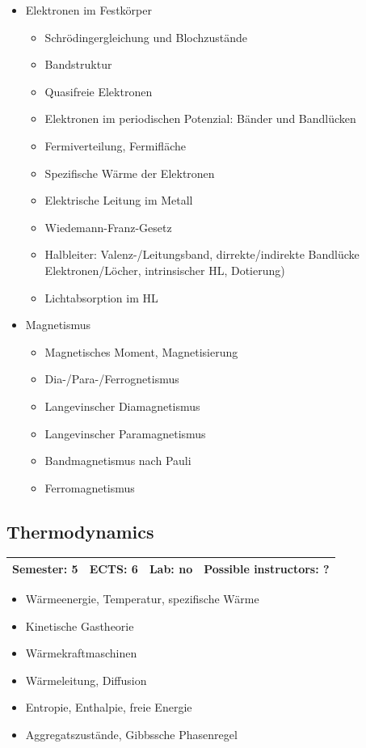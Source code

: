 \documentclass[12pt,twoside,fleqn,a4paper]{article}
\begin{document}
\begin{itemize}
\item Elektronen im Festkörper
\begin{itemize}
\item Schrödingergleichung und Blochzustände
\item Bandstruktur
\item Quasifreie Elektronen
\item Elektronen im periodischen Potenzial: Bänder und Bandlücken
\item Fermiverteilung, Fermifläche
\item Spezifische Wärme der Elektronen
\item Elektrische Leitung im Metall
\item Wiedemann-Franz-Gesetz
\item Halbleiter: Valenz-/Leitungsband, dirrekte/indirekte Bandlücke Elektronen/Löcher, intrinsischer HL, Dotierung)
\item Lichtabsorption im HL
\end{itemize}

\item Magnetismus
\begin{itemize}
\item Magnetisches Moment, Magnetisierung
\item Dia-/Para-/Ferrognetismus
\item Langevinscher Diamagnetismus
\item Langevinscher Paramagnetismus
\item Bandmagnetismus nach Pauli
\item Ferromagnetismus
\end{itemize}
\end{itemize}


\subsection{Thermodynamics}
\begin{tabular}{llll} \hline
\textbf{Semester:} 5 & \textbf{ECTS:} 6 & \textbf{Lab:} no & \textbf{Possible instructors:} ?\\
\hline
\end{tabular}

\begin{itemize}
\setlength\itemsep{0cm}
\item Wärmeenergie, Temperatur, spezifische Wärme
\item Kinetische Gastheorie
\item Wärmekraftmaschinen
\item Wärmeleitung, Diffusion
\item Entropie, Enthalpie, freie Energie
\item Aggregatszustände, Gibbssche Phasenregel
\end{itemize}
\end{document}
